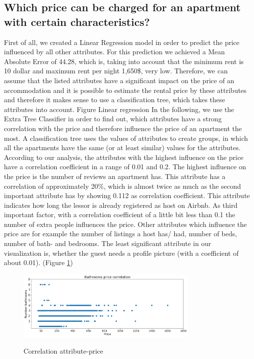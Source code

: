 \subsection{Which price can be charged for an apartment with certain characteristics?}
First of all, we created a Linear Regression model in order to predict the price influenced by all other attributes. For this prediction we achieved a Mean Absolute Error of 44.28, which is, taking into account that the minimum rent is 10 dollar and maximum rent per night 1,650\$, very low. Therefore, we can assume that the listed attributes have a significant impact on the price of an accommodation and it is possible to estimate the rental price by these attributes and therefore it makes sense to use a classification tree, which takes these attributes into account.
Figure Linear regression
In the following, we use the Extra Tree Classifier in order to find out, which attributes have a strong correlation with the price and therefore influence the price of an apartment the most. A classification tree uses the values of attributes to create groups, in which all the apartments have the same (or at least similar) values for the attributes. According to our analysis, the attributes with the highest influence on the price have a correlation coefficient in a range of 0.01 and 0.2. The highest influence on the price is the number of reviews an apartment has. This attribute has a correlation of approximately 20\%, which is almost twice as much as the second important attribute has by showing 0.112 as correlation coefficient. This attribute indicates how long the lessor is already registered as host on Airbnb. As third important factor, with a correlation coefficient of a little bit less than 0.1 the number of extra people influences the price. Other attributes which influence the price are for example the number of listings a host has/ had, number of beds, number of bath- and bedrooms. The least significant attribute in our visualization is, whether the guest needs a profile picture (with a coefficient of about 0.01). (Figure \ref{correlation-attribute-price})
\begin{figure}
  \begin{center}
  \includegraphics[width=3.5in]{photo/9_bathroom_price_correlation.png}\\
  \caption{Correlation attribute-price}\label{correlation-attribute-price}
  \end{center}
\end{figure}
